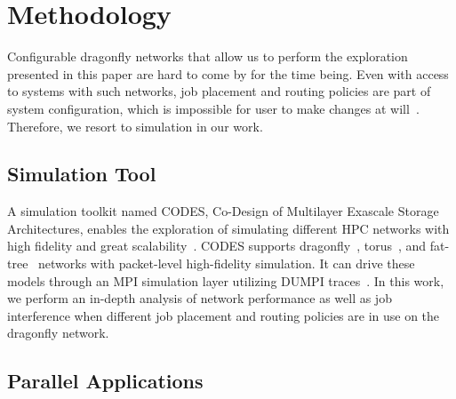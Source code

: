 

\section{Methodology}
\label{sec: methodology}

Configurable dragonfly networks that allow us to perform the exploration presented in this paper are hard to come by for the time being. Even with access to systems with such networks, job placement and routing policies are part of system configuration, which is impossible for user to make changes at will~\cite{jain-sc14, bhatele-sc11, zhou-ipdps-2015, jokanovic-ipdps-2015}. Therefore, we resort to simulation in our work.



\subsection{Simulation Tool}
\label{sec:simulation-tool}

A simulation toolkit named CODES, Co-Design of Multilayer Exascale Storage Architectures, enables the exploration of simulating different HPC networks with high fidelity and great scalability~\cite{codes}. CODES supports dragonfly~\cite{codes-dragonfly, misbah-tpds}, torus~\cite{misbah-pads-2014, ning-pads-2011}, and fat-tree~\cite{ning-pads-2015} networks with packet-level high-fidelity simulation. It can drive these models through an MPI simulation layer utilizing DUMPI traces~\cite{sst}. In this work, we perform an in-depth analysis of network performance as well as job interference when different job placement and routing policies are in use on the dragonfly network.

\subsection{Parallel Applications}
\label{sec: application traces}

